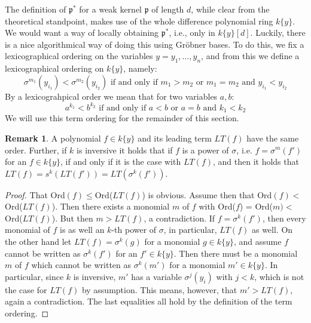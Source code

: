 \documentclass{article}
\def\p{\mathfrak{p}}
\def\s{\sigma}
\newenvironment{bew}{\begin{proof}[Proof]}{\end{proof}}
\theoremstyle{definition}
\newtheorem{rem}[Satz]{Remark}
\begin{document}
The definition of $\p^*$ for a weak kernel $\p$ of length $d$, while clear from the theoretical standpoint, makes use of the whole difference polynomial ring $k\{y\}$. 
We would want a way of locally obtaining $\p^*$, i.e., only in $k\{y\}[d]$. Luckily, there is a nice algorithmical way of doing this using Gröbner bases.
To do this, we fix a lexicographical ordering on the variables $y = y_1, \ldots, y_n$, and from this we define a lexicographical ordering on $k\{y\}$, namely:
\[ \s^{m_1}(y_{i_1}) < \s^{m_2}(y_{i_2})\text{ if and only if }m_1 > m_2\text{ or }m_1 = m_2\text{ and }y_{i_1} < y_{i_2} \]
 By a lexicograhpical order we mean that for two variables $a, b$:
\[ a^{k_1} < b^{k_2}\text{ if and only if }a < b\text{ or }a = b\text{ and }k_1 < k_2 \]
We will use this term ordering for the remainder of this section.
\begin{rem}\label{remorder}
A polynomial $f \in k\{y\}$ and its leading term $LT(f)$ have the same order. Further, if $k$ is inversive it holds that if $f$ is a power of $\s$, i.e. $f = \s^m(f')$ for an $f \in k\{y\}$,
if and only if it is the case with $LT(f)$, and then it holds that $LT(f) = s^k(LT(f')) = LT(\s^k(f'))$.
\begin{bew}
That Ord$(f) \leq $Ord($LT(f)$) is obvious. Assume then that Ord$(f) < $Ord($LT(f)$). Then there exists a monomial $m$ of $f$
with Ord($f$) = Ord($m) <$ Ord($LT(f)$). But then $m > LT(f)$, a contradiction. If $f =  \s^k(f')$, then every monomial of $f$ is as well an $k$-th power of $\s$, in particular, $LT(f)$ as well.
On the other hand let $LT(f) = \s^k(g)$ for a monomial $g \in k\{y\}$, and assume $f$ cannot be written as $\s^k(f')$ for an $f' \in k\{y\}$. 
Then there must be a monomial $m$ of $f$ which cannot be written as $\s^k(m')$ for a monomial $m' \in k\{y\}$. In particular, since $k$ is inversive, $m'$ has a variable $\s^j(y_i)$ with $j < k$, which is not the case
for $LT(f)$ by assumption. This means, however, that $m' > LT(f)$, again a contradiction. 
The last equalities all hold by the definition of the term ordering.
\end{bew}
\end{rem}
\end{document}
